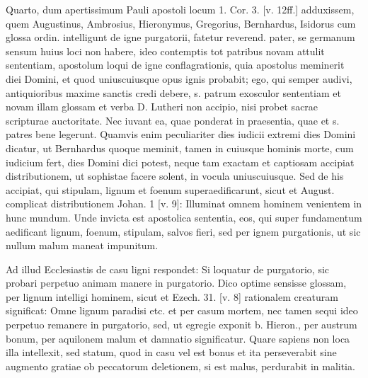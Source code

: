 Quarto, dum apertissimum Pauli apostoli locum 1. Cor. 3. [v. 12ff.] adduxissem, quem Augustinus, Ambrosius, Hieronymus, Gregorius, Bernhardus, Isidorus cum glossa ordin. intelligunt de igne purgatorii, fatetur reverend. pater, se germanum sensum huius loci non habere, ideo contemptis tot patribus novam attulit sententiam, apostolum loqui de igne conflagrationis, quia apostolus meminerit diei Domini, et quod uniuscuiusque opus ignis probabit; ego, qui semper audivi, antiquioribus maxime sanctis credi debere, s. patrum exosculor sententiam et novam illam glossam et verba D. Lutheri non accipio, nisi probet sacrae scripturae auctoritate. Nec iuvant ea, quae ponderat in praesentia, quae et s. patres bene legerunt. Quamvis enim peculiariter dies iudicii extremi dies Domini dicatur, ut Bernhardus quoque meminit, tamen in cuiusque hominis morte, cum iudicium fert, dies Domini dici potest, neque tam exactam et captiosam accipiat distributionem, ut sophistae facere solent, in vocula uniuscuiusque. Sed de his accipiat, qui stipulam, lignum et foenum superaedificarunt, sicut et August. complicat distributionem Johan. 1 [v. 9]: Illuminat omnem hominem venientem in hunc mundum. Unde invicta est apostolica sententia, eos, qui super fundamentum aedificant lignum, foenum, stipulam, salvos fieri, sed per ignem purgationis, ut sic nullum malum maneat impunitum.

Ad illud Ecclesiastis de casu ligni respondet: Si loquatur de purgatorio, sic probari perpetuo animam manere in purgatorio. Dico optime sensisse glossam, per lignum intelligi hominem, sicut et Ezech. 31. [v. 8] rationalem creaturam significat: Omne lignum paradisi etc. et per casum mortem, nec tamen sequi ideo perpetuo remanere in purgatorio, sed, ut egregie exponit b. Hieron., per austrum bonum, per aquilonem malum et damnatio significatur. Quare sapiens non loca illa intellexit, sed statum, quod in casu vel est bonus et ita perseverabit sine augmento gratiae ob peccatorum deletionem, si est malus, perdurabit in malitia.

